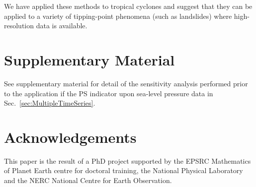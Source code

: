 \documentclass[%
aip,
amsmath,amssymb,
reprint,%
]{revtex4-1}
\begin{document}
We have applied these methods to tropical cyclones and suggest that they can be applied to a variety of tipping-point phenomena (such as landslides) where high-resolution data is available. 

\section*{Supplementary Material}
\label{sec:Supplementary}

See supplementary material for detail of the sensitivity analysis performed prior to the application if the PS indicator upon sea-level pressure data in Sec.~\ref{sec:MultipleTimeSeries}.

\section*{Acknowledgements}
\label{sec:Acknowledgements}

This paper is the result of a PhD project supported by the EPSRC Mathematics of Planet Earth centre for doctoral training, the National Physical Laboratory and the NERC National Centre for Earth Observation.
	

\end{document}
